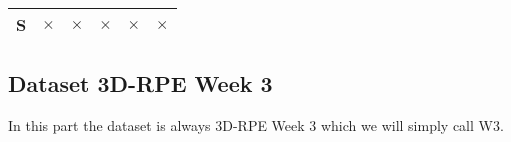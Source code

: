 \begin{table}[H]
\begin{tabular}{lccccc}
  S & $\times$                                                         & $\times$                                                        & $\times$                                              & $\times$                                                        & $\times$                                                        \\
  \bottomrule
\end{tabular}
\end{table}

\subsection{Dataset 3D-RPE Week 3}


In this part the dataset is always 3D-RPE Week 3 which we will simply call W3.

